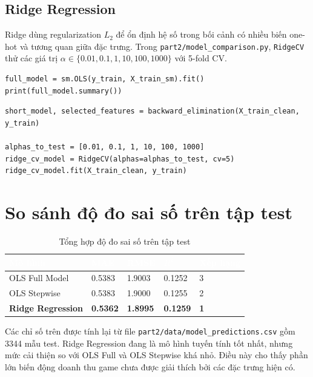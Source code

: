 \documentclass[12pt,a4paper]{article}
\newcommand{\tableheader}[1]{\textcolor{white}{\textbf{#1}}}
\newcommand{\bestcell}[1]{\textcolor{reportgreen}{\textbf{#1}}}
\begin{document}
\subsection{Ridge Regression}
Ridge dùng regularization $L_2$ để ổn định hệ số trong bối cảnh có nhiều biến one-hot và tương quan giữa đặc trưng. Trong \texttt{part2/model\_comparison.py}, \texttt{RidgeCV} thử các giá trị $\alpha \in \{0.01,0.1,1,10,100,1000\}$ với 5-fold CV.

\begin{lstlisting}[caption={Huấn luyện OLS Full trong \texttt{part2/model\_comparison.py}}]
full_model = sm.OLS(y_train, X_train_sm).fit()
print(full_model.summary())
\end{lstlisting}

\begin{lstlisting}[caption={Chọn biến và huấn luyện RidgeCV trong \texttt{part2/model\_comparison.py}}]
short_model, selected_features = backward_elimination(X_train_clean, y_train)

alphas_to_test = [0.01, 0.1, 1, 10, 100, 1000]
ridge_cv_model = RidgeCV(alphas=alphas_to_test, cv=5)
ridge_cv_model.fit(X_train_clean, y_train)
\end{lstlisting}

\section{So sánh độ đo sai số trên tập test}
\begin{table}[H]
\centering
\caption{Tổng hợp độ đo sai số trên tập test}
\begin{tabular}{L{4.2cm}C{2cm}C{2cm}C{2cm}C{1.8cm}}
\tableheader{Mô hình} & \tableheader{MAE} & \tableheader{RMSE} & \tableheader{$R^2$} & \tableheader{Xếp hạng} \\
\midrule
OLS Full Model & 0.5383 & 1.9003 & 0.1252 & 3 \\
OLS Stepwise & 0.5383 & 1.9000 & 0.1255 & 2 \\
\textbf{Ridge Regression} & \bestcell{0.5362} & \bestcell{1.8995} & \bestcell{0.1259} & \bestcell{1} \\
\bottomrule
\end{tabular}
\end{table}

Các chỉ số trên được tính lại từ file \texttt{part2/data/model\_predictions.csv} gồm 3344 mẫu test. Ridge Regression đang là mô hình tuyến tính tốt nhất, nhưng mức cải thiện so với OLS Full và OLS Stepwise khá nhỏ. Điều này cho thấy phần lớn biến động doanh thu game chưa được giải thích bởi các đặc trưng hiện có.
\end{document}
